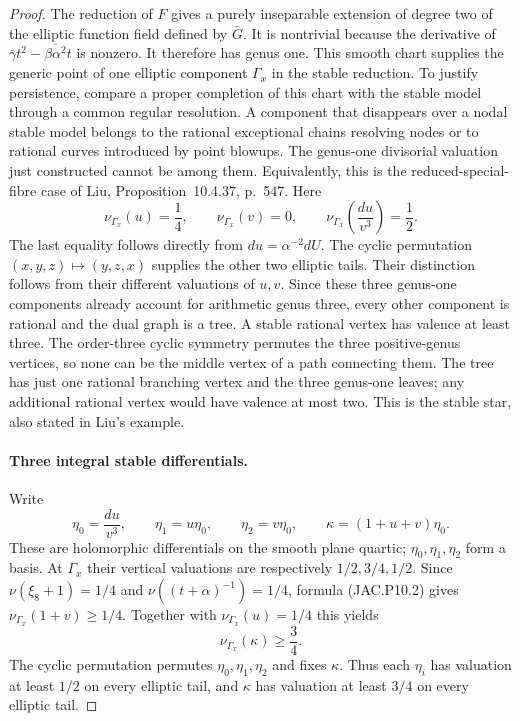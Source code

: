 \documentclass[11pt,a4paper]{article}
\begin{document}
\begin{proof}
The reduction of $F$ gives a purely inseparable extension of degree
two of the elliptic function field defined by $\bar G$. It is
nontrivial because the derivative of
$\bar\gamma t^2-\overline{\beta\alpha^2}t$ is nonzero.
It therefore has genus one. This smooth chart supplies the generic
point of one elliptic component $\Gamma_x$ in the stable reduction.
To justify persistence, compare a proper completion of this chart
with the stable model through a common regular resolution. A
component that disappears over a nodal stable model belongs to the
rational exceptional chains resolving nodes or to rational curves
introduced by point blowups. The genus-one divisorial valuation
just constructed cannot be among them. Equivalently, this is the
reduced-special-fibre case of Liu, Proposition~10.4.37, p.~547.
Here
\[
 \nu_{\Gamma_x}(u)=\frac14,\qquad
 \nu_{\Gamma_x}(v)=0,
 \qquad
 \nu_{\Gamma_x}\!\left(\frac{du}{v^3}\right)=\frac12.
                                                        \tag{JAC.P10.5}
\]
The last equality follows directly from $du=\alpha^{-2}dU$.
The cyclic permutation $(x,y,z)\mapsto(y,z,x)$ supplies the other
two elliptic tails. Their distinction follows from their different
valuations of $u,v$. Since these three genus-one components already
account for arithmetic genus three, every other component is
rational and the dual graph is a tree. A stable rational vertex has
valence at least three. The order-three cyclic symmetry permutes
the three positive-genus vertices, so none can be the middle vertex
of a path connecting them. The tree has just one rational branching
vertex and the three genus-one leaves; any additional rational
vertex would have valence at most two. This is the stable star,
also stated in Liu's example.

\paragraph{Three integral stable differentials.}
Write
\[
 \eta_0=\frac{du}{v^3},\qquad
 \eta_1=u\eta_0,\qquad \eta_2=v\eta_0,
 \qquad \kappa=(1+u+v)\eta_0.
                                                        \tag{JAC.P10.6}
\]
These are holomorphic differentials on the smooth plane quartic;
$\eta_0,\eta_1,\eta_2$ form a basis. At $\Gamma_x$ their vertical
valuations are respectively $1/2,3/4,1/2$.
Since $\nu(\xi_8+1)=1/4$ and $\nu((t+\alpha)^{-1})=1/4$,
formula (JAC.P10.2) gives $\nu_{\Gamma_x}(1+v)\ge1/4$.
Together with $\nu_{\Gamma_x}(u)=1/4$ this yields
\[
 \nu_{\Gamma_x}(\kappa)\ge\frac34.
\]
The cyclic permutation permutes $\eta_0,\eta_1,\eta_2$ and fixes
$\kappa$. Thus each $\eta_i$ has valuation at least $1/2$ on
every elliptic tail, and $\kappa$ has valuation at least $3/4$
on every elliptic tail.


\end{proof}
\end{document}
